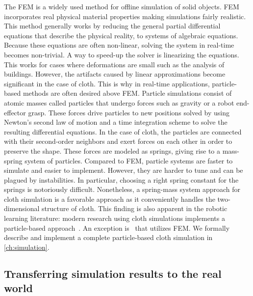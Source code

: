 \documentclass[\home/main.tex]{subfiles}
\begin{document}
The \gls{FEM} is a widely used method for offline simulation of solid objects. \Gls{FEM} incorporates real physical material properties making simulations fairly realistic. This method generally works by reducing the general partial differential equations that describe the physical reality, to systems of algebraic equations. Because these equations are often non-linear, solving the system in real-time becomes non-trivial. A way to speed-up the solver is linearizing the equations. This works for cases where deformations are small such as the analysis of buildings. However, the artifacts caused by linear approximations become significant in the case of cloth. This is why in real-time applications, particle-based methods are often desired above \gls{FEM}. Particle simulations consist of atomic masses called particles that undergo forces such as gravity or a robot end-effector grasp. These forces drive particles to new positions solved by using Newton's second law of motion and a time integration scheme to solve the resulting differential equations. In the case of cloth, the particles are connected with their second-order neighbors and exert forces on each other in order to preserve the shape. These forces are modeled as springs, giving rise to a mass-spring system of particles. Compared to \gls{FEM}, particle systems are faster to simulate and easier to implement. However, they are harder to tune and can be plagued by instabilities. In particular, choosing a right spring constant for the springs is notoriously difficult. Nonetheless, a spring-mass system approach for cloth simulation is a favorable approach as it conveniently handles the two-dimensional structure of cloth. This finding is also apparent in the robotic learning literature: modern research using cloth simulations implements a particle-based approach~\autocite{Matas2018,seita2021learning,dedo,softgym}. An exception is~\autocite{liang2019differentiable} that utilizes \gls{FEM}. We formally describe and implement a complete particle-based cloth simulation in \cref{ch:simulation}.

\subsection{Transferring simulation results to the real world}  \label{sec:lit_sim2real}

\end{document}
